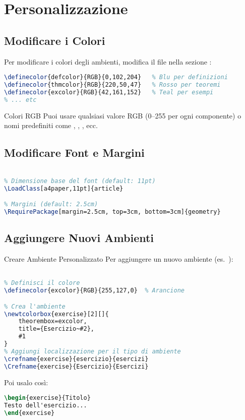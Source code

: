 \documentclass{csnotes}
\begin{document}
\section{Personalizzazione}

\subsection{Modificare i Colori}

Per modificare i colori degli ambienti, modifica il file  
nella sezione :

\begin{lstlisting}[language=TeX]
% Nel file csnotes.cls
\definecolor{defcolor}{RGB}{0,102,204}   % Blu per definizioni
\definecolor{thmcolor}{RGB}{220,50,47}   % Rosso per teoremi
\definecolor{excolor}{RGB}{42,161,152}   % Teal per esempi
% ... etc
\end{lstlisting}

\begin{note}{Colori RGB}
Puoi usare qualsiasi valore RGB (0--255 per ogni componente) o nomi predefiniti
come , , , ecc.
\end{note}

\subsection{Modificare Font e Margini}

\begin{lstlisting}[language=TeX]
% Nel file csnotes.cls

% Dimensione base del font (default: 11pt)
\LoadClass[a4paper,11pt]{article}

% Margini (default: 2.5cm)
\RequirePackage[margin=2.5cm, top=3cm, bottom=3cm]{geometry}
\end{lstlisting}

\subsection{Aggiungere Nuovi Ambienti}

\begin{example}{Creare Ambiente Personalizzato}
Per aggiungere un nuovo ambiente (es.\ ):
\begin{lstlisting}[language=TeX]
% Nel file csnotes.cls, dopo gli altri ambienti

% Definisci il colore
\definecolor{excolor}{RGB}{255,127,0}  % Arancione

% Crea l'ambiente
\newtcolorbox{exercise}[2][]{
    theorembox=excolor,
    title={Esercizio~#2},
    #1
}
% Aggiungi localizzazione per il tipo di ambiente
\crefname{exercise}{esercizio}{esercizi}
\Crefname{exercise}{Esercizio}{Esercizi}
\end{lstlisting}

Poi usalo così:
\begin{lstlisting}[language=TeX]
\begin{exercise}{Titolo}
Testo dell'esercizio...
\end{exercise}
\end{lstlisting}
\end{example}
\end{document}
